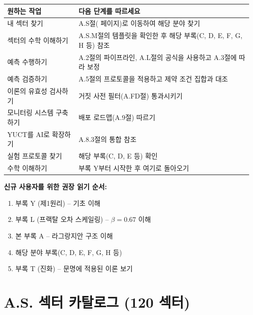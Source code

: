 \documentclass[13pt,a4paper]{article}
\begin{document}
	\begin{tabularx}{\textwidth}{|p{3.5cm}|X|}
		\hline
		\textbf{원하는 작업} & \textbf{다음 단계를 따르세요} \\
		\hline
		내 섹터 찾기 & A.S절(\pageref{sec:sector-catalog} 페이지)로 이동하여 해당 분야 찾기 \\
		\hline
		섹터의 수학 이해하기 & A.S.M절의 템플릿을 확인한 후 해당 부록(C, D, E, F, G, H 등) 참조 \\
		\hline
		예측 수행하기 & A.2절의 파이프라인, A.L절의 공식을 사용하고 A.3절에 따라 보정 \\
		\hline
		예측 검증하기 & A.5절의 프로토콜을 적용하고 제약 조건 집합과 대조 \\
		\hline
		이론의 유효성 검사하기 & 거짓 사전 필터(A.FD절) 통과시키기 \\
		\hline
		모니터링 시스템 구축하기 & 배포 로드맵(A.9절) 따르기 \\
		\hline
		YUCT를 AI로 확장하기 & A.8.3절의 통합 참조 \\
		\hline
		실험 프로토콜 찾기 & 해당 부록(C, D, E 등) 확인 \\
		\hline
		수학 이해하기 & 부록 Y부터 시작한 후 여기로 돌아오기 \\
		\hline
	\end{tabularx}
	
	\vspace{0.5cm}
	\noindent\textbf{신규 사용자를 위한 권장 읽기 순서:}
	\begin{enumerate}
		\item 부록 Y (제1원리) – 기초 이해
		\item 부록 L (프랙탈 오차 스케일링) – $\beta = 0.67$ 이해
		\item 본 부록 A – 라그랑지안 구조 이해
		\item 해당 분야 부록(C, D, E, F, G, H 등)
		\item 부록 T (진화) – 문명에 적용된 이론 보기
	\end{enumerate}
	
	
	\tableofcontents
	\newpage
	
	\section*{A.S. 섹터 카탈로그 (120 섹터)}
	\label{sec:sector-catalog}
\end{document}
